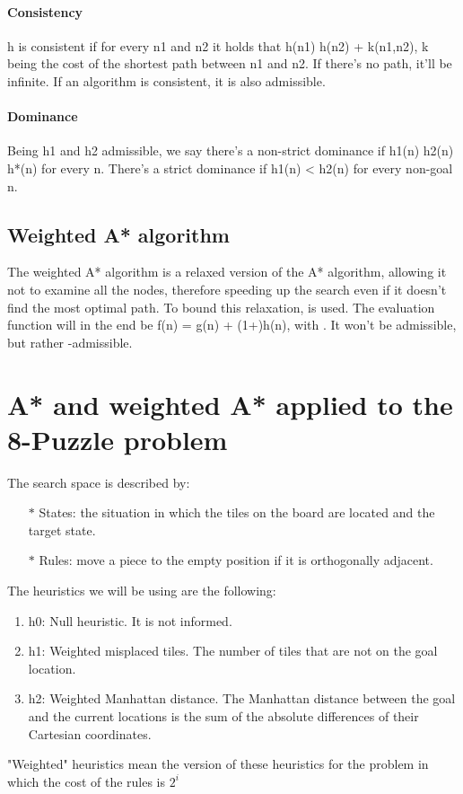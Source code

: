 \documentclass[runningheads]{llncs}
\begin{document}
\paragraph{Consistency}
h is consistent if for every n1 and n2 it holds that h(n1) \leq h(n2) + k(n1,n2), k being the cost of the shortest path between n1 and n2. If there's no path, it'll be infinite. If an algorithm is consistent, it is also admissible.
\paragraph{Dominance}
Being h1 and h2 admissible, we say there's a non-strict dominance if h1(n) \leq h2(n) \leq h*(n) for every n.
There's a strict dominance if h1(n) < h2(n) for every non-goal n.
\subsection{Weighted A* algorithm}
The weighted A* algorithm is a relaxed version of the A* algorithm, allowing it not to examine all the nodes, therefore speeding up the search even if it doesn't find the most optimal path. To bound this relaxation, \varepsilon is used. The evaluation function will in the end be f(n) = g(n) + (1+\varepsilon)h(n), with \varepsilon {}. It won't be admissible, but rather \varepsilon-admissible.

\section{A* and weighted A* applied to the 8-Puzzle problem} \label{s:awa8p}
The search space is described by:
\begin{itemize}
\item[$\ast$]States: the situation in which the tiles on the board are located and the target state.
\item[$\ast$]Rules: move a piece to the empty position if it is orthogonally adjacent.
\end{itemize}
The heuristics we will be using are the following:
\begin{enumerate}
\item h0: Null heuristic. It is not informed.
\item h1: Weighted misplaced tiles. The number of tiles that are not on the goal location.
\item h2: Weighted Manhattan distance. The Manhattan distance between the goal and the current locations is the sum of the absolute differences of their Cartesian coordinates.
\end{enumerate}
"Weighted" heuristics mean the version of these heuristics for the problem in which the cost of the rules is \(2^i\)
\end{document}
